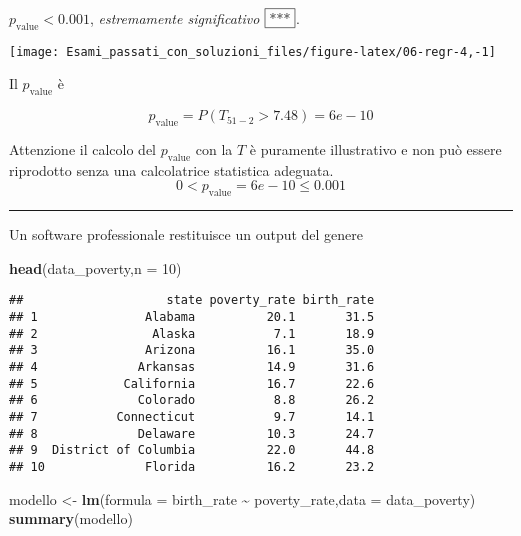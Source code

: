 \documentclass[
  11pt,
]{book}
\newenvironment{Shaded}{\begin{snugshade}}{\end{snugshade}}
\newcommand{\AttributeTok}[1]{\textcolor[rgb]{0.13,0.29,0.53}{#1}}
\newcommand{\DecValTok}[1]{\textcolor[rgb]{0.00,0.00,0.81}{#1}}
\newcommand{\FunctionTok}[1]{\textcolor[rgb]{0.13,0.29,0.53}{\textbf{#1}}}
\newcommand{\NormalTok}[1]{#1}
\newcommand{\OtherTok}[1]{\textcolor[rgb]{0.56,0.35,0.01}{#1}}
\newcommand{\SpecialCharTok}[1]{\textcolor[rgb]{0.81,0.36,0.00}{\textbf{#1}}}
\theoremstyle{mytheoremstyle}
\theoremstyle{mydefstyle}
\newenvironment{sol}
  {
  \begin{tcolorbox}[enhanced,breakable,arc=0.1mm,boxrule=1pt,colback=white,colframe=iblue,
  title=\bf \fontfamily{lmss}\selectfont \hspace{.5 cm} Soluzione,drop fuzzy shadow]

}{
\end{tcolorbox}
  }
\begin{document}
\begin{sol}
\(p_\text{value}<0.001\), \emph{estremamente significativo} \(\fbox{***}\).

\begin{center}\texttt{[image: Esami\_passati\_con\_soluzioni\_files/figure-latex/06-regr-4,-1]} \end{center}

Il \(p_{\text{value}}\) è

\[ p_{\text{value}} = P(T_{51-2}>7.48)=6e-10 \]

Attenzione il calcolo del \(p_\text{value}\) con la \(T\) è puramente illustrativo e non può essere riprodotto senza una calcolatrice statistica adeguata.\[
 0 < p_\text{value}= 6e-10 \leq 0.001 
\]

\end{sol}

\begin{center}\rule{0.5\linewidth}{0.5pt}\end{center}

Un software professionale restituisce un output del genere

\begin{Shaded}
\begin{Highlighting}[]
\FunctionTok{head}\NormalTok{(data\_poverty,}\AttributeTok{n =} \DecValTok{10}\NormalTok{)}
\end{Highlighting}
\end{Shaded}

\begin{verbatim}
##                    state poverty_rate birth_rate
## 1               Alabama          20.1       31.5
## 2                Alaska           7.1       18.9
## 3               Arizona          16.1       35.0
## 4              Arkansas          14.9       31.6
## 5            California          16.7       22.6
## 6              Colorado           8.8       26.2
## 7           Connecticut           9.7       14.1
## 8              Delaware          10.3       24.7
## 9  District of Columbia          22.0       44.8
## 10              Florida          16.2       23.2
\end{verbatim}

\begin{Shaded}
\begin{Highlighting}[]
\NormalTok{modello }\OtherTok{\textless{}{-}} \FunctionTok{lm}\NormalTok{(}\AttributeTok{formula =}\NormalTok{ birth\_rate }\SpecialCharTok{\textasciitilde{}}\NormalTok{ poverty\_rate,}\AttributeTok{data =}\NormalTok{ data\_poverty)}
\FunctionTok{summary}\NormalTok{(modello)}
\end{Highlighting}
\end{Shaded}
\end{document}
